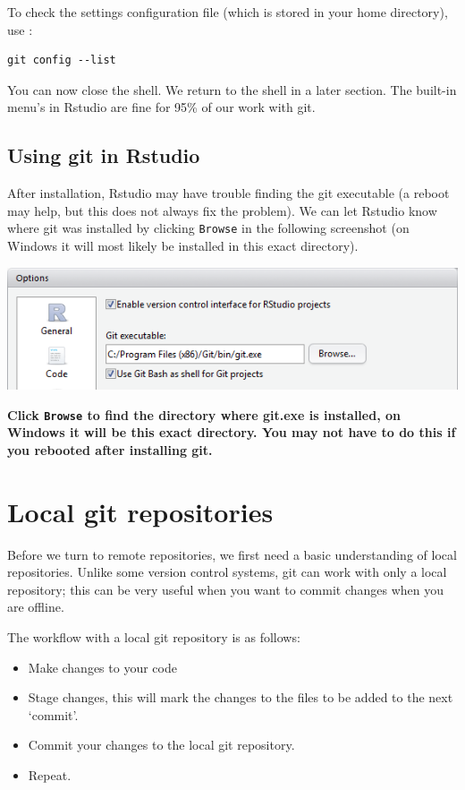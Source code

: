 \documentclass[]{book}
\providecommand{\tightlist}{%
  \setlength{\itemsep}{0pt}\setlength{\parskip}{0pt}}
\begin{document}
To check the settings configuration file (which is stored in your home directory), use :

\begin{verbatim}
git config --list
\end{verbatim}

You can now close the shell. We return to the shell in a later section. The built-in menu's in Rstudio are fine for 95\% of our work with git.

\hypertarget{using-git-in-rstudio}{%
\subsection{Using git in Rstudio}\label{using-git-in-rstudio}}

After installation, Rstudio may have trouble finding the git executable (a reboot may help, but this does not always fix the problem). We can let Rstudio know where git was installed by clicking \texttt{Browse} in the following screenshot (on Windows it will most likely be installed in this exact directory).

\includegraphics[width=0.75\linewidth]{screenshots/gitoptionsrstudio}

\textbf{Click \texttt{Browse} to find the directory where git.exe is installed, on Windows it will be this exact directory. You may not have to do this if you rebooted after installing git.}

\hypertarget{localgit}{%
\section{Local git repositories}\label{localgit}}

Before we turn to remote repositories, we first need a basic understanding of local repositories. Unlike some version control systems, git can work with only a local repository; this can be very useful when you want to commit changes when you are offline.

The workflow with a local git repository is as follows:

\begin{itemize}
\tightlist
\item
  Make changes to your code
\item
  Stage changes, this will mark the changes to the files to be added to the next `commit'.
\item
  Commit your changes to the local git repository.
\item
  Repeat.
\end{itemize}
\end{document}

